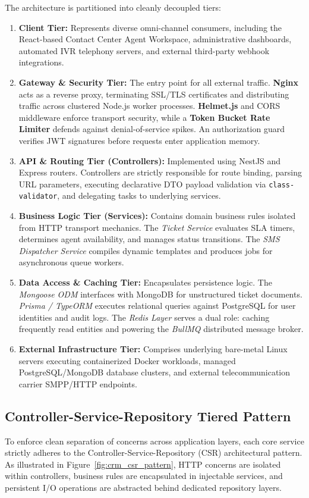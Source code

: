 The architecture is partitioned into cleanly decoupled tiers:
\begin{enumerate}
    \item \textbf{Client Tier:} Represents diverse omni-channel consumers, including the React-based Contact Center Agent Workspace, administrative dashboards, automated IVR telephony servers, and external third-party webhook integrations.
    \item \textbf{Gateway \& Security Tier:} The entry point for all external traffic. \textbf{Nginx} acts as a reverse proxy, terminating SSL/TLS certificates and distributing traffic across clustered Node.js worker processes. \textbf{Helmet.js} and CORS middleware enforce transport security, while a \textbf{Token Bucket Rate Limiter} defends against denial-of-service spikes. An authorization guard verifies JWT signatures before requests enter application memory.
    \item \textbf{API \& Routing Tier (Controllers):} Implemented using NestJS and Express routers. Controllers are strictly responsible for route binding, parsing URL parameters, executing declarative DTO payload validation via \texttt{class-validator}, and delegating tasks to underlying services.
    \item \textbf{Business Logic Tier (Services):} Contains domain business rules isolated from HTTP transport mechanics. The \textit{Ticket Service} evaluates SLA timers, determines agent availability, and manages status transitions. The \textit{SMS Dispatcher Service} compiles dynamic templates and produces jobs for asynchronous queue workers.
    \item \textbf{Data Access \& Caching Tier:} Encapsulates persistence logic. The \textit{Mongoose ODM} interfaces with MongoDB for unstructured ticket documents. \textit{Prisma / TypeORM} executes relational queries against PostgreSQL for user identities and audit logs. The \textit{Redis Layer} serves a dual role: caching frequently read entities and powering the \textit{BullMQ} distributed message broker.
    \item \textbf{External Infrastructure Tier:} Comprises underlying bare-metal Linux servers executing containerized Docker workloads, managed PostgreSQL/MongoDB database clusters, and external telecommunication carrier SMPP/HTTP endpoints.
\end{enumerate}

\subsection{Controller-Service-Repository Tiered Pattern}
To enforce clean separation of concerns across application layers, each core service strictly adheres to the Controller-Service-Repository (CSR) architectural pattern. As illustrated in Figure~\ref{fig:crm_csr_pattern}, HTTP concerns are isolated within controllers, business rules are encapsulated in injectable services, and persistent I/O operations are abstracted behind dedicated repository layers.

